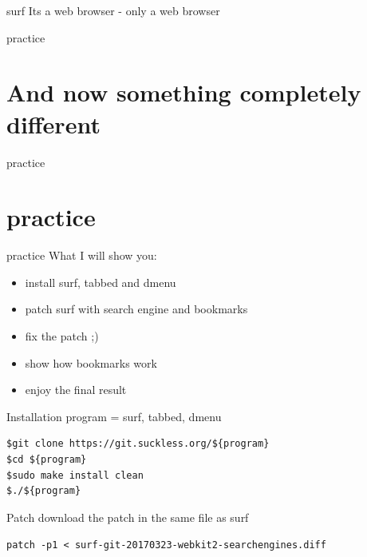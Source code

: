\documentclass[10pt,graphics,aspectratio=169,table]{beamer}
\begin{document}
\begin{frame}{surf}
Its a web browser - only a web browser
\end{frame}

\begin{frame}{practice}
    \section*{And now something completely different}

\end{frame}
\begin{frame}{practice}
    \section{practice}
\end{frame}

\begin{frame}{practice}
What I will show you:
    \begin{itemize}
        \item install surf, tabbed and dmenu
        \item patch surf with search engine and bookmarks
        \item fix the patch ;)
        \item show how bookmarks work
        \item enjoy the final result
    \end{itemize}
\end{frame}

\begin{frame}[fragile]{Installation}
	program = surf, tabbed, dmenu
	\begin{lstlisting}
$git clone https://git.suckless.org/${program}
$cd ${program}
$sudo make install clean
$./${program}
\end{lstlisting}

\end{frame}

\begin{frame}{Patch}
	download the patch in the same file as surf
	
	\texttt{patch -p1 < surf-git-20170323-webkit2-searchengines.diff}
\end{frame}
\end{document}
